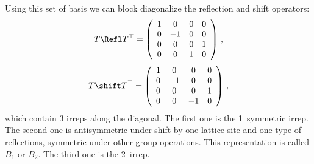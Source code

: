 \begin{description}
Using this set of basis we can block diagonalize the reflection and shift operators:
\[
T{\Refl}T^{\top} =
\left(
\begin{array}{cccc}
 1 & 0 & 0 & 0 \\
 0 & -1 & 0 & 0 \\
 0 & 0 & 0 & 1 \\
 0 & 0 & 1 & 0 \\
\end{array}
\right) \,,
\]
\[
T \shift T^{\top} =
\left(
\begin{array}{cccc}
 1 & 0 & 0 & 0 \\
 0 & -1 & 0 & 0 \\
 0 & 0 & 0 & 1 \\
 0 & 0 & -1 & 0 \\
\end{array}
\right) \,,
\]
which contain 3 irreps along the diagonal. The first one is the 1\dmn\ symmetric irrep. The second
one is antisymmetric under shift by one lattice site and one type of reflections, symmetric
under other group operations. This representation is called $B_1$ or $B_2$. The third one is the
2\dmn\ irrep.


\end{description}
